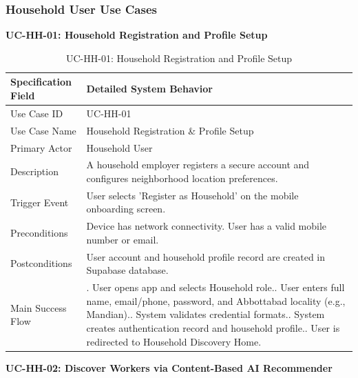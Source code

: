 \documentclass[12pt,a4paper]{article}
\begin{document}
\subsubsection{Household User Use Cases}
\noindent\textbf{UC-HH-01: Household Registration and Profile Setup}\par
\vspace{4pt}
\begingroup\small\setlength{\tabcolsep}{3pt}\renewcommand{\arraystretch}{1.15}
\begin{longtable}{|>{\raggedright\arraybackslash}p{\dimexpr(\linewidth-4\tabcolsep-3\arrayrulewidth)/2\relax}|>{\raggedright\arraybackslash}p{\dimexpr(\linewidth-4\tabcolsep-3\arrayrulewidth)/2\relax}|}
\caption{UC-HH-01: Household Registration and Profile Setup}\label{tab:uc-hh-01}\\
\hline
Specification Field & Detailed System Behavior \\ \hline
Use Case ID & UC-HH-01 \\ \hline
Use Case Name & Household Registration \& Profile Setup \\ \hline
Primary Actor & Household User \\ \hline
Description & A household employer registers a secure account and configures neighborhood location preferences. \\ \hline
Trigger Event & User selects 'Register as Household' on the mobile onboarding screen. \\ \hline
Preconditions & Device has network connectivity. User has a valid mobile number or email. \\ \hline
Postconditions & User account and household profile record are created in Supabase database. \\ \hline
Main Success Flow & 1. User opens app and selects Household role.\newline 2. User enters full name, email/\allowbreak{}phone, password, and Abbottabad locality (e.g., Mandian).\newline 3. System validates credential formats.\newline 4. System creates authentication record and household profile.\newline 5. User is redirected to Household Discovery Home. \\ \hline
\end{longtable}
\endgroup
\clearpage
\noindent\textbf{UC-HH-02: Discover Workers via Content-Based AI Recommender}\par
\vspace{4pt}
\begingroup\small\setlength{\tabcolsep}{3pt}\renewcommand{\arraystretch}{1.15}
\end{document}
